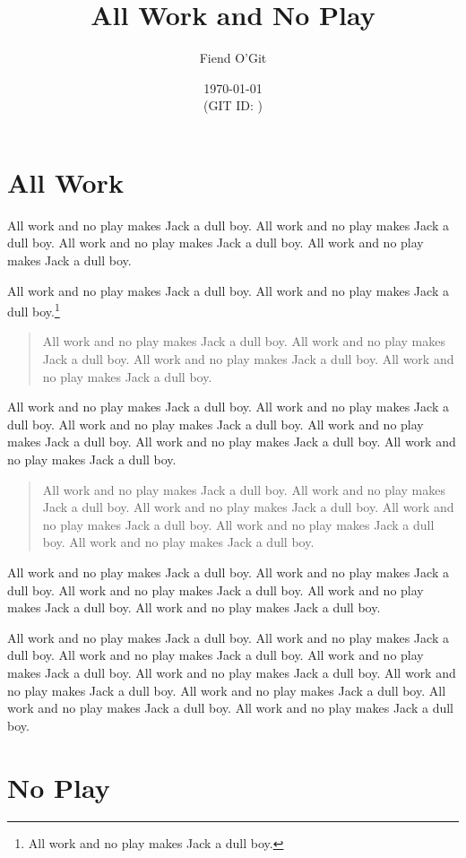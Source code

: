 \documentclass[12pt]{article}
\author{Fiend O'Git}
\title{All Work and No Play}
\date{\today\\{\footnotesize (GIT ID: \texttt{\gitinfo{@head}{commit}})}}
\begin{document}
\maketitle
\thispagestyle{empty}

\section{All Work}

All work and no play makes Jack a dull boy.
All work and no play makes Jack a dull boy.
All work and no play makes Jack a dull boy.
All work and no play makes Jack a dull boy.

All work and no play makes Jack a dull boy.
All work and no play makes Jack a dull boy.\footnote{
All work and no play makes Jack a dull boy.}
\begin{quote}
All work and no play makes Jack a dull boy.
All work and no play makes Jack a dull boy.
All work and no play makes Jack a dull boy.
All work and no play makes Jack a dull boy.
\end{quote}
All work and no play makes Jack a dull boy.
All work and no play makes Jack a dull boy.
All work and no play makes Jack a dull boy.
All work and no play makes Jack a dull boy.
All work and no play makes Jack a dull boy.
All work and no play makes Jack a dull boy.

\begin{quote}
All work and no play makes Jack a dull boy.
All work and no play makes Jack a dull boy.
All work and no play makes Jack a dull boy.
All work and no play makes Jack a dull boy.
All work and no play makes Jack a dull boy.
All work and no play makes Jack a dull boy.
\end{quote}

All work and no play makes Jack a dull boy.
All work and no play makes Jack a dull boy.
All work and no play makes Jack a dull boy.
All work and no play makes Jack a dull boy.
All work and no play makes Jack a dull boy.

All work and no play makes Jack a dull boy.
All work and no play makes Jack a dull boy.
All work and no play makes Jack a dull boy.
All work and no play makes Jack a dull boy.
All work and no play makes Jack a dull boy.
All work and no play makes Jack a dull boy.
All work and no play makes Jack a dull boy.
All work and no play makes Jack a dull boy.
All work and no play makes Jack a dull boy.

\section{No Play}
\end{document}
